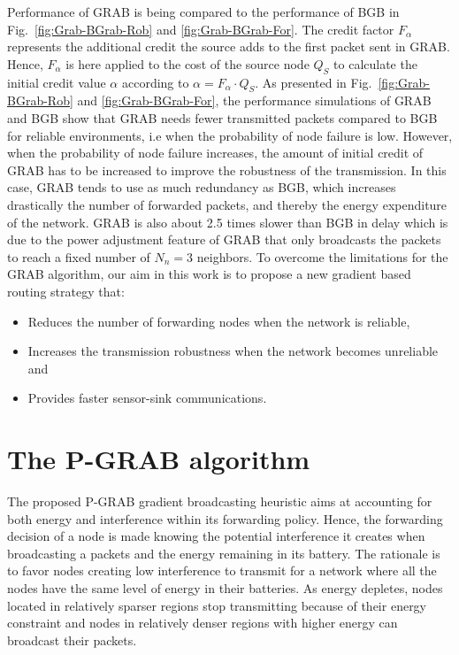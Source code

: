 \documentclass[journal, peerreview, onecolumn, draftcls]{IEEEtran}
\begin{document}
Performance of GRAB is being compared to the performance of BGB in Fig.~\ref{fig:Grab-BGrab-Rob} and \ref{fig:Grab-BGrab-For}. The credit factor $F_\alpha$ represents the additional credit the source adds to the first packet sent in GRAB. Hence, $F_\alpha$ is here applied to the cost of the source node $Q_S$ to calculate the initial credit value $\alpha$ according to $\alpha = F_\alpha \cdot Q_S$.
As presented in Fig.~\ref{fig:Grab-BGrab-Rob} and \ref{fig:Grab-BGrab-For}, the performance simulations of GRAB and BGB show that GRAB needs fewer transmitted packets compared to BGB for reliable environments, i.e when the probability of node failure is low. However, when the probability of node failure increases, the amount of initial credit of GRAB has to be increased to improve the robustness of the transmission. In this case, GRAB tends to use as much redundancy as BGB, which increases drastically the number of forwarded packets, and thereby the energy expenditure of the network.
GRAB is also about 2.5 times slower than BGB in delay which is due to the power adjustment feature of GRAB that only broadcasts the packets to reach a fixed number of $N_n=3$ neighbors.
To overcome the limitations for the GRAB algorithm, our aim in this work is to propose a new gradient based routing strategy that:
\begin{itemize}
\item Reduces the number of forwarding nodes when the network is reliable,
\item Increases the transmission robustness when the network becomes unreliable and
\item Provides faster sensor-sink communications.
\end{itemize}


\section{The P-GRAB algorithm}\label{sec:PGRAB}

The proposed P-GRAB gradient broadcasting heuristic aims at accounting for both energy and interference within its forwarding policy. Hence, the forwarding decision of a node is made knowing the potential interference it creates when broadcasting a packets and the energy remaining in its battery. The rationale is to favor nodes creating low interference to transmit for a network where all the nodes have the same level of energy in their batteries. As energy depletes, nodes located in relatively sparser regions stop transmitting because of their energy constraint and nodes in relatively denser regions with higher energy can broadcast their packets.
\end{document}
